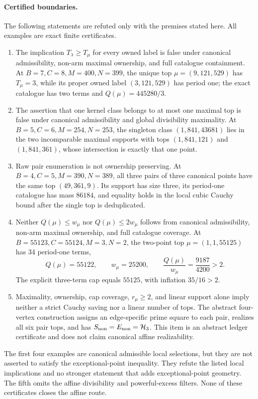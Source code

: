 \paragraph{Certified boundaries.}
The following statements are refuted only with the premises stated here.
All examples are exact finite certificates.
\begin{enumerate}
\item The implication \(T_\lambda\ge T_\mu\) for every owned label is false
under canonical admissibility, non-arm maximal ownership, and full catalogue
containment.  At \(B=7,C=8,M=400,N=399\), the unique top
\(\mu=(9,121,529)\) has \(T_\mu=3\), while its proper owned label
\((3,121,529)\) has period one; the exact catalogue has two terms and
\(Q(\mu)=445280/3\).
\item The assertion that one kernel class belongs to at most one maximal top
is false under canonical admissibility and global divisibility maximality.
At \(B=5,C=6,M=254,N=253\), the singleton class
\((1,841,43681)\) lies in the two incomparable maximal supports with tops
\((1,841,121)\) and \((1,841,361)\), whose intersection is exactly that one
point.
\item Raw pair enumeration is not ownership preserving.  At
\(B=4,C=5,M=390,N=389\), all three pairs of three canonical points have the
same top \((49,361,9)\).  Its support has size three, its period-one
catalogue has mass \(86184\), and equality holds in the local cubic Cauchy
bound after the single top is deduplicated.
\item Neither \(Q(\mu)\le w_\mu\) nor \(Q(\mu)\le2w_\mu\) follows from
canonical admissibility, non-arm maximal ownership, and full catalogue
coverage.  At \(B=55123,C=55124,M=3,N=2\), the two-point top
\(\mu=(1,1,55125)\) has 34 period-one terms,
\[
 Q(\mu)=55122,\qquad w_\mu=25200,\qquad
 \frac{Q(\mu)}{w_\mu}=\frac{9187}{4200}>2.
\]
The explicit three-term cap equals \(55125\), with inflation \(35/16>2\).
\item Maximality, ownership, cap coverage, \(r_\mu\ge2\), and linear support
alone imply neither a strict Cauchy saving nor a linear number of tops.  The
abstract four-vertex construction assigns an edge-specific prime square to
each pair, realizes all six pair tops, and has
\(S_{\rm non}=E_{\rm non}=\mathcal H_3\).  This item is an abstract ledger
certificate and does not claim canonical affine realizability.
\end{enumerate}
The first four examples are canonical admissible local selections, but they
are not asserted to satisfy the exceptional-point inequality.  They refute
the listed local implications and no stronger statement that adds
exceptional-point geometry.  The fifth omits the affine divisibility and
powerful-excess filters.  None of these certificates closes the affine
route.

